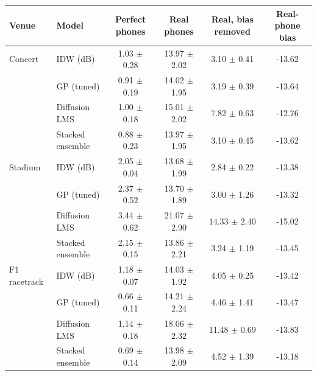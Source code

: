 \begin{tabular}{llcccc}
\toprule
Venue & Model & Perfect phones & Real phones & Real, bias removed & Real-phone bias \\
\midrule
Concert & IDW (dB) & 1.03 $\pm$ 0.28 & 13.97 $\pm$ 2.02 & 3.10 $\pm$ 0.41 & -13.62 \\
 & GP (tuned) & 0.91 $\pm$ 0.19 & 14.02 $\pm$ 1.95 & 3.19 $\pm$ 0.39 & -13.64 \\
 & Diffusion LMS & 1.00 $\pm$ 0.18 & 15.01 $\pm$ 2.02 & 7.82 $\pm$ 0.63 & -12.76 \\
 & Stacked ensemble & 0.88 $\pm$ 0.23 & 13.97 $\pm$ 1.95 & 3.10 $\pm$ 0.45 & -13.62 \\
\midrule
Stadium & IDW (dB) & 2.05 $\pm$ 0.04 & 13.68 $\pm$ 1.99 & 2.84 $\pm$ 0.22 & -13.38 \\
 & GP (tuned) & 2.37 $\pm$ 0.52 & 13.70 $\pm$ 1.89 & 3.00 $\pm$ 1.26 & -13.32 \\
 & Diffusion LMS & 3.44 $\pm$ 0.62 & 21.07 $\pm$ 2.90 & 14.33 $\pm$ 2.40 & -15.02 \\
 & Stacked ensemble & 2.15 $\pm$ 0.15 & 13.86 $\pm$ 2.21 & 3.24 $\pm$ 1.19 & -13.45 \\
\midrule
F1 racetrack & IDW (dB) & 1.18 $\pm$ 0.07 & 14.03 $\pm$ 1.92 & 4.05 $\pm$ 0.25 & -13.42 \\
 & GP (tuned) & 0.66 $\pm$ 0.11 & 14.21 $\pm$ 2.24 & 4.46 $\pm$ 1.41 & -13.47 \\
 & Diffusion LMS & 1.14 $\pm$ 0.18 & 18.06 $\pm$ 2.32 & 11.48 $\pm$ 0.69 & -13.83 \\
 & Stacked ensemble & 0.69 $\pm$ 0.14 & 13.98 $\pm$ 2.09 & 4.52 $\pm$ 1.39 & -13.18 \\
\bottomrule
\end{tabular}
